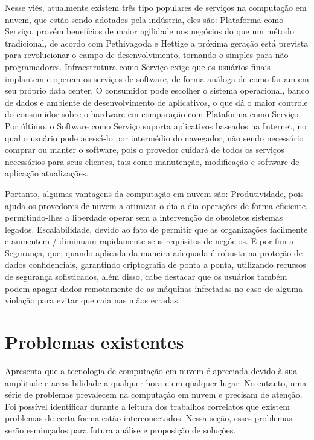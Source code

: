 \documentclass[12pt]{article}
\begin{document}
Nesse viés, atualmente existem três tipo populares de serviços na computação em nuvem, que estão sendo adotados pela indústria, eles são: Plataforma como Serviço, provém benefícios de maior agilidade nos negócios do que um método tradicional, de acordo com Pethiyagoda e Hettige a próxima geração está prevista para revolucionar o campo de desenvolvimento, tornando-o simples para não programadores. Infraestrutura como Serviço exige que os usuários finais implantem e operem os serviços de software, de forma análoga de como fariam em seu próprio data center. O consumidor pode escolher o sistema operacional, banco de dados e ambiente de desenvolvimento de aplicativos, o que dá o maior controle do consumidor sobre o hardware em comparação com Plataforma como Serviço. Por último, o Software como Serviço suporta aplicativos baseados na Internet, no qual o usuário pode acessá-lo por intermédio do navegador, não sendo necessário comprar ou manter o software, pois o provedor cuidará de todos os serviços necessários para seus clientes, tais como manutenção, modificação e software de aplicação atualizações.

Portanto, algumas vantagens da computação em nuvem são: Produtividade, pois ajuda os provedores de nuvem a otimizar o dia-a-dia operações de forma eficiente, permitindo-lhes a liberdade operar sem a intervenção de obsoletos sistemas legados. Escalabilidade, devido ao fato de permitir que as organizações facilmente e aumentem / diminuam rapidamente seus requisitos de negócios. E por fim a Segurança, que, quando aplicada da maneira adequada é robusta na proteção de dados confidenciais, garantindo criptografia de ponta a ponta, utilizando recursos de segurança sofisticados, além disso, cabe destacar que os usuários também podem apagar dados remotamente de as máquinas infectadas no caso de alguma violação para evitar que caia nas mãos erradas\cite{rani}.

\section{Problemas existentes}
\cite{rani} Apresenta que a tecnologia de computação em nuvem é apreciada devido à sua amplitude e acessibilidade a qualquer hora e em qualquer lugar. No entanto, uma série de problemas prevalecem na computação em nuvem e precisam de atenção. Foi possível identificar durante a leitura dos trabalhos correlatos que existem problemas de certa forma estão interconectados. Nessa seção, esses problemas serão esmiuçados para futura análise e proposição de soluções.
\end{document}
